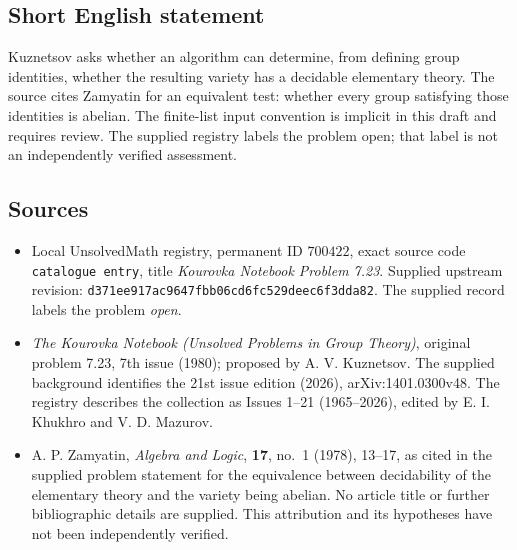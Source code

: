 \documentclass[11pt]{article}
\begin{document}
\subsection{Short English statement}
Kuznetsov asks whether an algorithm can determine, from defining group identities, whether the resulting variety has a decidable elementary theory. The source cites Zamyatin for an equivalent test: whether every group satisfying those identities is abelian. The finite-list input convention is implicit in this draft and requires review. The supplied registry labels the problem open; that label is not an independently verified assessment.
\subsection{Sources}
\begin{itemize}
\item Local UnsolvedMath registry, permanent ID \(700422\), exact source code \texttt{catalogue entry}, title \emph{Kourovka Notebook Problem 7.23}. Supplied upstream revision: \texttt{d371ee917ac9647fbb06cd6fc529deec6f3dda82}. The supplied record labels the problem \emph{open}.
\item \emph{The Kourovka Notebook (Unsolved Problems in Group Theory)}, original problem 7.23, 7th issue (1980); proposed by A. V. Kuznetsov. The supplied background identifies the 21st issue edition (2026), arXiv:1401.0300v48. The registry describes the collection as Issues 1--21 (1965--2026), edited by E. I. Khukhro and V. D. Mazurov.
\item A. P. Zamyatin, \emph{Algebra and Logic}, \textbf{17}, no.\ 1 (1978), 13--17, as cited in the supplied problem statement for the equivalence between decidability of the elementary theory and the variety being abelian. No article title or further bibliographic details are supplied. This attribution and its hypotheses have not been independently verified.
\end{itemize}
\end{document}
